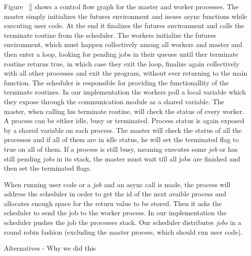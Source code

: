 Figure ~\ref{} shows a control flow graph for the master and worker processes.  The master simply initializes
the futures environment and issues async functions while executing user code.  At the end it finalizes 
the futures environment and calls the terminate routine from the scheduler.  The workers initialize 
the futures environment, which must happen collectively among all workers and master and then enter a
loop, looking for pending jobs in their queues until ther terminate routine returns true, in which case
they exit the loop, finalize again collectively with all other processes and exit the program, without ever
returning to the main function.  The scheduler is responsible for providing the functionallity of the terminate
routines.  In our implementation the workers poll a local variable which they expose through the communication
module as a shared variable.  The master, when calling his terminate routine, will check the status of every 
worker.  A process can be either idle, busy or terminated.  Process status is again exposed by a shared variable
on each process.  The master will check the status of all the processes and if all of them are in idle status, he
will set the terminated flag to true on all of them.  If a process is still busy, meaning executes some \emph{job}
or has still pending \emph{jobs} in its stack, the master must wait till all jobs are finished and then set the 
terminated flags.

When running user code or a \emph{job} and an async call is made, the process will address the scheduler in order
to get the id of the next avaible process and allocates enough space for the return value to be stored.
Then it asks the scheduler to send the job to the worker process.  In our implementation the scheduler 
pushes the job the processes stack.  Our scheduler distributes \emph{jobs} in a round robin fashion 
(excluding the master process, which should run user code). 


      
         
Alternatives - Why we did this

